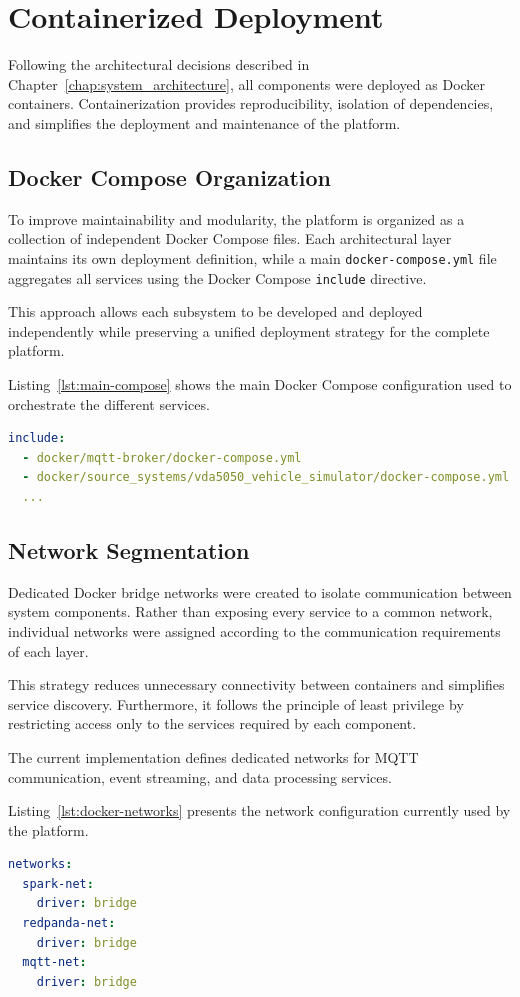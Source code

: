 \section{Containerized Deployment} Following the architectural decisions described in Chapter~\ref{chap:system_architecture}, all components were deployed as Docker containers. Containerization provides reproducibility, isolation of dependencies, and simplifies the deployment and maintenance of the platform. 

\subsection{Docker Compose Organization} 
To improve maintainability and modularity, the platform is organized as a collection of independent Docker Compose files. Each architectural layer maintains its own deployment definition, while a main \texttt{docker-compose.yml} file aggregates all services using the Docker Compose \texttt{include} directive. 

This approach allows each subsystem to be developed and deployed independently while preserving a unified deployment strategy for the complete platform. 

Listing~\ref{lst:main-compose} shows the main Docker Compose configuration used to orchestrate the different services.

\begin{lstlisting}[language=yaml, caption={Main Docker Compose structure}, label={lst:main-compose}, basicstyle=\ttfamily\small, breaklines=true]
include:
  - docker/mqtt-broker/docker-compose.yml
  - docker/source_systems/vda5050_vehicle_simulator/docker-compose.yml
  ...
\end{lstlisting}

\subsection{Network Segmentation} 
Dedicated Docker bridge networks were created to isolate communication between system components. Rather than exposing every service to a common network, individual networks were assigned according to the communication requirements of each layer. 

This strategy reduces unnecessary connectivity between containers and simplifies service discovery. Furthermore, it follows the principle of least privilege by restricting access only to the services required by each component. 

The current implementation defines dedicated networks for MQTT communication, event streaming, and data processing services.

Listing~\ref{lst:docker-networks} presents the network configuration currently used by the platform.

\begin{lstlisting}[language=yaml, caption={Docker network configuration}, label={lst:docker-networks}, basicstyle=\ttfamily\small, breaklines=true]
networks:
  spark-net:
    driver: bridge
  redpanda-net:
    driver: bridge
  mqtt-net:
    driver: bridge
\end{lstlisting}
   
